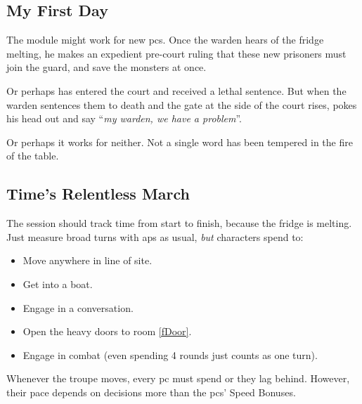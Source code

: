 \subsection{My First Day}

The module might work for new \glspl{pc}.
Once the \gls{warden} hears of the fridge melting, he makes an expedient pre-court ruling that these new prisoners must join the \gls{guard}, and save the \glspl{monster} at once.

Or perhaps  has entered the \gls{court} and received a lethal sentence.
But when the \gls{warden} sentences them to death and the gate at the side of the \gls{court} rises,  pokes his head out and say ``\textit{my \gls{warden}, we have a problem}''.

Or perhaps it works for neither.
Not a single word has been tempered in the fire of the table.

\subsection{Time's Relentless March}

The session should track time from start to finish, because the fridge is melting.
Just measure broad turns with \glspl{ap} as usual, \emph{but} characters spend  to:

\begin{itemize}
  \item
  Move anywhere in line of site.
  \item
  Get into a boat.
  \item
  Engage in a conversation.
  \item
  Open the heavy doors to room \vref{fDoor}.
  \item
  Engage in combat (even spending 4 \glspl{round} just counts as one turn).
\end{itemize}

Whenever the troupe moves, every \gls{pc} must spend  or they lag behind.
However, their pace depends on decisions more than the \glspl{pc}' Speed Bonuses.

